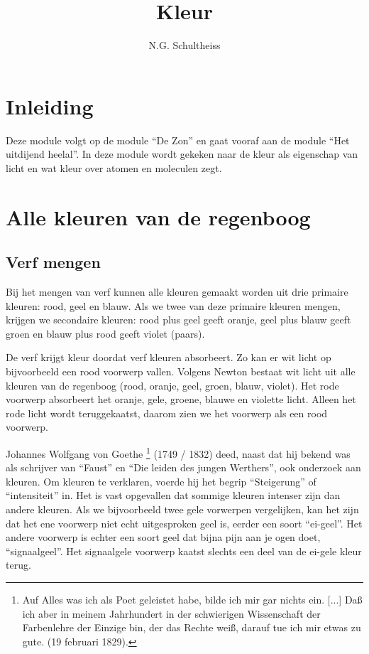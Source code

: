 



\title{Kleur}
\author{N.G. Schultheiss}
\date{}

\maketitle
\thispagestyle{firststyle}

\section{Inleiding}

Deze module volgt op de module ``De Zon'' en gaat vooraf aan de
module ``Het uitdijend heelal''. In deze module wordt gekeken naar
de kleur als eigenschap van licht en wat kleur over atomen en moleculen
zegt.


\section{Alle kleuren van de regenboog}


\subsection{Verf mengen}

Bij het mengen van verf kunnen alle kleuren gemaakt worden uit drie
primaire kleuren: rood, geel en blauw. Als we twee van deze primaire
kleuren mengen, krijgen we secondaire kleuren: rood plus geel geeft
oranje, geel plus blauw geeft groen en blauw plus rood geeft violet
(paars). 

De verf krijgt kleur doordat verf kleuren absorbeert. Zo kan er wit
licht op bijvoorbeeld een rood voorwerp vallen. Volgens Newton bestaat
wit licht uit alle kleuren van de regenboog (rood, oranje, geel, groen,
blauw, violet). Het rode voorwerp absorbeert het oranje, gele, groene,
blauwe en violette licht. Alleen het rode licht wordt teruggekaatst,
daarom zien we het voorwerp als een rood voorwerp.

Johannes Wolfgang von Goethe \footnote{Auf Alles was ich als Poet
geleistet habe, bilde ich mir gar nichts ein. {[}...{]} Daß ich aber in
meinem Jahrhundert in der schwierigen Wissenschaft der Farbenlehre der
Einzige bin, der das Rechte weiß, darauf tue ich mir etwas zu gute. (19
februari 1829).} (1749 / 1832) deed, naast dat hij bekend was als
schrijver van ``Faust'' en ``Die leiden des jungen Werthers'', ook
onderzoek aan kleuren. Om kleuren te verklaren, voerde hij het begrip
``Steigerung'' of ``intensiteit'' in. Het is vast opgevallen dat sommige
kleuren intenser zijn dan andere kleuren. Als we bijvoorbeeld twee gele
vorwerpen vergelijken, kan het zijn dat het ene voorwerp niet echt
uitgesproken geel is, eerder een soort ``ei-geel''. Het andere voorwerp
is echter een soort geel dat bijna pijn aan je ogen doet,
``signaalgeel''. Het signaalgele voorwerp kaatst slechts een deel van de
ei-gele kleur terug.

